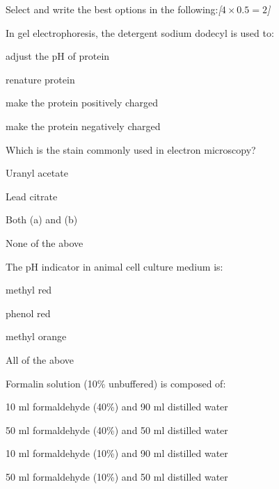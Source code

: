 \documentclass[11pt,a4paper]{article}
\newcommand{\pts}[1]{\hfill   \textit{[#1]}}
\begin{document}
\begin{parts}
  \item Select and write the best options in the following:\pts{$4  \times 0.5 = 2$}
  
\begin{parts}
    \item In gel electrophoresis, the detergent sodium dodecyl is used to:
    
\begin{parts}
      \item adjust the pH of protein
      \item renature protein
      \item make the protein positively charged
      \item make the protein negatively charged
    \end{parts}
    
    \item Which is the stain commonly used in electron microscopy?
    
\begin{parts}
      \item Uranyl acetate
      \item Lead citrate
      \item Both (a) and (b)
      \item None of the above
    \end{parts}

    \item The pH indicator in animal cell culture medium is:
    
\begin{parts}
      \item methyl red
      \item phenol red
      \item methyl orange
      \item All of the above
    \end{parts}

    \item Formalin solution (10\% unbuffered) is composed of:
    
\begin{parts}
      \item 10 ml formaldehyde (40\%) and 90 ml distilled water
      \item 50 ml formaldehyde (40\%) and 50 ml distilled water
      \item 10 ml formaldehyde (10\%) and 90 ml distilled water
      \item 50 ml formaldehyde (10\%) and 50 ml distilled water
    \end{parts}
  \end{parts}
  

\end{parts}
\end{document}
